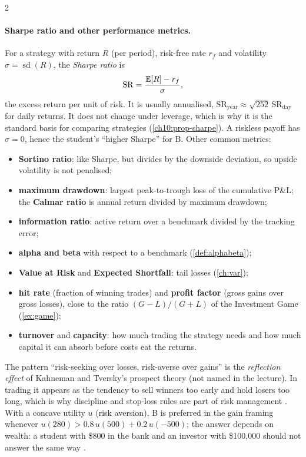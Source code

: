 \begin{paracol}{2}
\paragraph{Sharpe ratio and other performance metrics.} For a strategy with return $R$ (per period),
risk-free rate $r_f$ and volatility $\sigma=\operatorname{sd}(R)$, the \emph{Sharpe ratio} is
\[
  \mathrm{SR}=\frac{\mathbb{E}[R]-r_f}{\sigma},
\]
the excess return per unit of risk. It is usually annualised, $\mathrm{SR}_{\text{year}}\approx\sqrt{252}\,\mathrm{SR}_{\text{day}}$ for
daily returns. It does not change under leverage, which is why it is the standard basis for
comparing strategies (\cref{ch10:prop-sharpe}). A riskless payoff has $\sigma=0$, hence the student's
``higher Sharpe'' for B. Other common metrics:
\begin{itemize}
  \item \textbf{Sortino ratio}: like Sharpe, but divides by the downside deviation, so upside
        volatility is not penalised;
  \item \textbf{maximum drawdown}: largest peak-to-trough loss of the cumulative P\&L;
        the \textbf{Calmar ratio} is annual return divided by maximum drawdown;
  \item \textbf{information ratio}: active return over a benchmark divided by the tracking error;
  \item \textbf{alpha and beta} with respect to a benchmark (\cref{def:alphabeta});
  \item \textbf{Value at Risk} and \textbf{Expected Shortfall}: tail losses (\cref{ch:var});
  \item \textbf{hit rate} (fraction of winning trades) and \textbf{profit factor} (gross gains over
        gross losses), close to the ratio $(G-L)/(G+L)$ of the Investment Game (\cref{ex:game});
  \item \textbf{turnover} and \textbf{capacity}: how much trading the strategy needs and how much
        capital it can absorb before costs eat the returns.
\end{itemize}

\begin{intuition}
The pattern ``risk-seeking over losses, risk-averse over gains'' is the \emph{reflection effect}
of Kahneman and Tversky's prospect theory (not named in the lecture). In trading it appears as the
tendency to sell winners too early and hold losers too long, which is why discipline and
stop-loss rules are part of risk management . With a concave utility $u$
(risk aversion), B is preferred in the gain framing whenever $u(280) > 0.8\,u(500)+0.2\,u(-500)$;
the answer depends on wealth: a student with \$800 in the bank and an investor with \$100{,}000
should not answer the same way .
\end{intuition}



\end{paracol}
